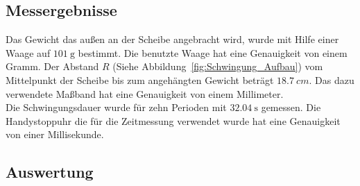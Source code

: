 \documentclass{article}
\begin{document}
		\subsection{Messergebnisse}
			Das Gewicht das außen an der Scheibe angebracht wird, wurde mit Hilfe einer Waage auf \(\SI{101}{\gram}\) bestimmt.
			Die benutzte Waage hat eine Genauigkeit von einem Gramm.
			Der Abstand \(R\) (Siehe Abbildung~\ref{fig:Schwingung_Aufbau}) vom Mittelpunkt der Scheibe
			bis zum angehängten Gewicht beträgt \(\SI{18,7}{cm}\).
			Das dazu verwendete Maßband hat eine Genauigkeit von einem Millimeter. \\
			Die Schwingungsdauer wurde für zehn Perioden mit \(\SI{32,04}{\second}\) gemessen.
			Die Handystoppuhr die für die Zeitmessung verwendet wurde hat eine Genauigkeit von einer Millisekunde.
			
		\subsection{Auswertung}
\end{document}
